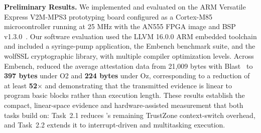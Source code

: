 \textbf{Preliminary Results.}
We implemented and evaluated \enola on the ARM Versatile Express V2M-MPS3 prototyping board configured as a Cortex-M85 microcontroller running at 25 MHz with the AN555 FPGA image and BSP v1.3.0~\cite{ARMMPS3}.
Our software evaluation used the LLVM 16.0.0 ARM embedded toolchain and included a syringe-pump application, the Embench benchmark suite, and the wolfSSL cryptographic library, with multiple compiler optimization levels.
Across Embench, \enola reduced the average attestation data from 21,009 bytes with Blast~\cite{yadav2023whole} to \textbf{397 bytes} under O2 and \textbf{224 bytes} under Oz, corresponding to a reduction of at least \textbf{52$\times$} and demonstrating that the transmitted evidence is linear to program basic blocks rather than execution length.
These results establish the compact, linear-space evidence and hardware-assisted measurement that both tasks build on: Task~2.1 reduces \enola's remaining TrustZone context-switch overhead, and Task~2.2 extends it to interrupt-driven and multitasking execution.